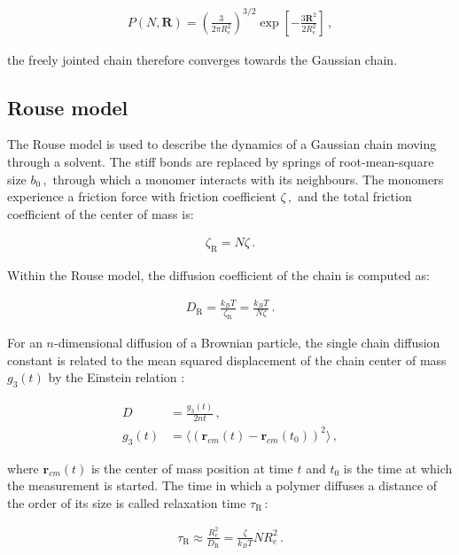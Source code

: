 \documentclass[bachelor,       %
               twoside,        %
               BCOR10mm,       %
               ngerman, english %
               ]{GAUBM}
\begin{document}
 
\begin{align}
    P(N,\mathbf R)=\left(\frac{3}{2\pi R_e^2}\right)^{3/2}\exp\left[-\frac{3\mathbf R^2}{2R_e^2}\right]\,,
\end{align}
 
 the freely jointed chain therefore converges towards the Gaussian chain. 
 
\subsection{Rouse model}

The Rouse model \cite{Rouse} is used to describe the dynamics of a Gaussian chain moving through a solvent. The stiff bonds are replaced by springs of root-mean-square size $b_0\,,$ through which a monomer interacts with its neighbours. The monomers experience a friction force with friction coefficient  $\zeta\,,$ and the total friction coefficient of the center of mass is:

\begin{align}
    \zeta_\mathrm R=N\zeta\,.
\end{align}

Within the Rouse model, the diffusion coefficient of the chain is computed as:

\begin{align}
    D_\mathrm R=\frac{k_BT}{\zeta_\mathrm R}=\frac{k_BT}{N\zeta}\,.
    \label{eq:d_rouse}
\end{align}

For an $n$-dimensional diffusion of a Brownian particle, the single chain diffusion constant is related to the mean squared displacement of the chain center of mass $g_3(t)$ by the Einstein relation \cite{einstein_1905}:

\begin{align}
    D&=\frac{g_3(t)}{2nt}\,, \label{eq:einstein_relation}\\
    g_3(t)&=\langle (\mathbf r_{cm}(t)-\mathbf r_{cm}(t_0))^2\rangle\,,\nonumber
\end{align}

where $\mathbf r_{cm}(t)$ is the center of mass position at time $t$ and $t_0$ is the time at which the measurement is started. The time in which a polymer diffuses a distance of the order of its size is called relaxation time $\tau_\mathrm R\,$:

\begin{align}
    \tau_\mathrm R\approx\frac{R_e^2}{D_\mathrm R}=\frac{\zeta}{k_BT}{NR_e^2}\,.
\end{align}
\end{document}
